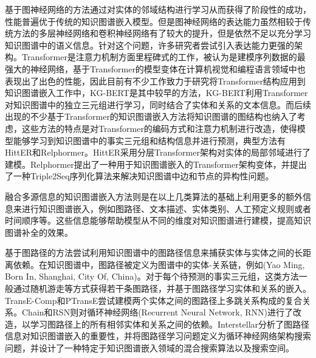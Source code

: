基于图神经网络的方法通过对实体的邻域结构进行学习从而获得了阶段性的成功，性能普遍优于传统的知识图谱嵌入模型。但是图神经网络的表达能力虽然相较于传统方法的多层神经网络和卷积神经网络有了较大的提升，但是依然不足以充分学习知识图谱中的语义信息。针对这个问题，许多研究者尝试引入表达能力更强的架构。Transformer是注意力机制方面里程碑式的工作，被认为是建模序列数据的最强大的神经网络，基于Transformer的模型变体在计算机视觉和编程语言领域中也表现出了出色的性能，因此目前有不少工作致力于研究将Transformer结构应用到知识图谱嵌入工作中，KG-BERT是其中较早的方法，KG-BERT利用Transformer对知识图谱中的独立三元组进行学习，同时结合了实体和关系的文本信息。而后续出现的不少基于Transformer的知识图谱嵌入方法将知识图谱的图结构也纳入了考虑，这些方法的特点是对Transformer的编码方式和注意力机制进行改造，使得模型能够学习到知识图谱中的事实三元组和结构信息并进行预测，典型方法有HittER和Relphormer。HittER采用分层Transformer架构对实体的局部邻域进行了建模。Relphormer提出了一种用于知识图谱嵌入的Transformer架构变体，并提出了一种Triple2Seq序列化算法来解决知识图谱中边和节点的异构性问题。

融合多源信息的知识图谱嵌入方法则是在以上几类算法的基础上利用更多的额外信息来进行知识图谱嵌入，例如图路径、文本描述、实体类别、人工预定义规则或者时间顺序等。这些信息能够帮助模型从不同的维度对知识图谱进行建模，提高知识图谱补全的效果。

基于图路径的方法尝试利用知识图谱中的图路径信息来捕获实体与实体之间的长距离依赖。在知识图谱中，图路径被定义为图谱中的实体-关系链，例如(Yao Ming, Born In, Shanghai, City Of, China)。对于每个待预测的事实三元组，这类方法一般通过随机游走等方式获得若干条图路径，并基于图路径学习实体和关系的嵌入。TransE-Comp和PTransE尝试建模两个实体之间的图路径上多跳关系构成的复合关系。Chain和RSN则对循环神经网络(Recurrent Neural Network, RNN)进行了改造，以学习图路径上的所有相邻实体和关系之间的依赖。Interstellar分析了图路径信息对知识图谱嵌入的重要性，并将图路径学习问题定义为循环神经网络架构搜索问题，并设计了一种特定于知识图谱嵌入领域的混合搜索算法以及搜索空间。

